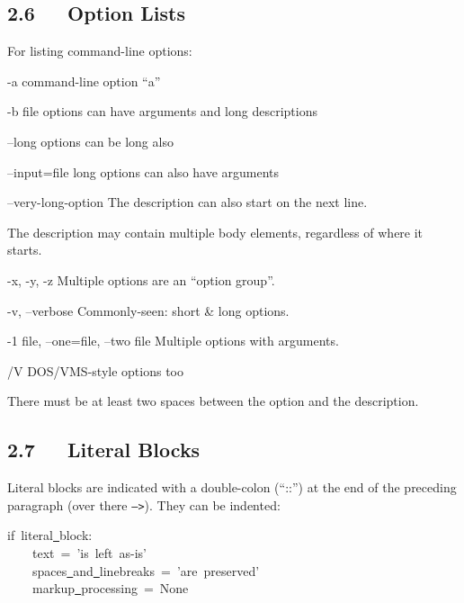\documentclass[10pt,a4paper,english]{article}
\newcommand{\optionlistlabel}[1]{\bf #1 \hfill}
\newenvironment{optionlist}[1]
{\begin{list}{}
  {\setlength{\labelwidth}{#1}
   \setlength{\rightmargin}{1cm}
   \setlength{\leftmargin}{\rightmargin}
   \addtolength{\leftmargin}{\labelwidth}
   \addtolength{\leftmargin}{\labelsep}
   \renewcommand{\makelabel}{\optionlistlabel}}
}{\end{list}}
\begin{document}

\hypertarget{option-lists}{}
\subsection*{2.6~~~Option Lists}

For listing command-line options:
\begin{optionlist}{3cm}
\item [-a]  
command-line option ``a''
\item [-b file]  
options can have arguments
and long descriptions
\item [--long]  
options can be long also
\item [--input=file]  
long options can also have
arguments
\item [--very-long-option]  
The description can also start on the next line.

The description may contain multiple body elements,
regardless of where it starts.
\item [-x, -y, -z]  
Multiple options are an ``option group''.
\item [-v, --verbose]  
Commonly-seen: short {\&} long options.
\item [-1 file, --one=file, --two file]  
Multiple options with arguments.
\item [/V]  
DOS/VMS-style options too
\end{optionlist}

There must be at least two spaces between the option and the
description.



\hypertarget{literal-blocks}{}
\subsection*{2.7~~~Literal Blocks}

Literal blocks are indicated with a double-colon (``::'') at the end of
the preceding paragraph (over there \texttt{-->}).  They can be indented:
\begin{ttfamily}\begin{flushleft}
if~literal{\underline{~}}block:~\\
~~~~text~=~'is~left~as-is'~\\
~~~~spaces{\underline{~}}and{\underline{~}}linebreaks~=~'are~preserved'~\\
~~~~markup{\underline{~}}processing~=~None
\end{flushleft}\end{ttfamily}
\end{document}
